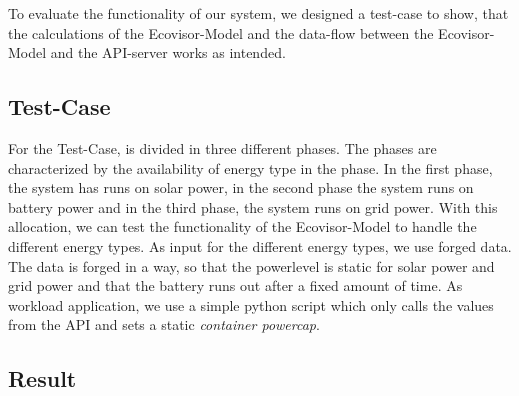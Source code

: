 
To evaluate the functionality of our system, we designed a test-case to show, that the calculations of the Ecovisor-Model and the data-flow between the Ecovisor-Model and the API-server works as intended.

\subsection{Test-Case}
For the Test-Case, is divided in three different phases. The phases are characterized by the availability of energy type in the phase. In the first phase, the system has runs on solar power, in the second phase the system runs on battery power and in the third phase, the system runs on grid power. With this allocation, we can test the functionality of the Ecovisor-Model to handle the different energy types. As input for the different energy types, we use forged data. The data is forged in a way, so that the powerlevel is static for solar power and grid power and that the battery runs out after a fixed amount of time. As workload application, we use a simple python script which only calls the values from the API and sets a static \textit{container powercap}.

\subsection{Result}
